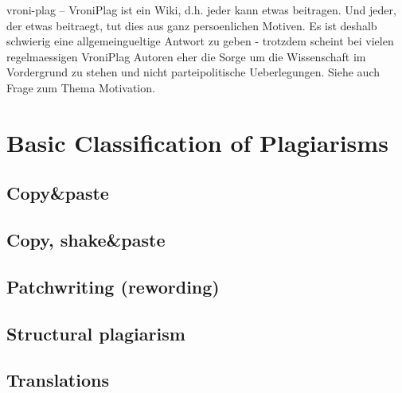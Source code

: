 vroni-plag -- VroniPlag ist ein Wiki, d.h. jeder kann etwas beitragen. Und jeder, der etwas beitraegt, tut dies aus ganz persoenlichen Motiven. Es ist deshalb schwierig eine allgemeingueltige Antwort zu geben - trotzdem scheint bei vielen regelmaessigen VroniPlag Autoren eher die Sorge um die Wissenschaft im Vordergrund zu stehen und nicht parteipolitische Ueberlegungen. Siehe auch Frage zum Thema Motivation. 


\newpage
\section{Basic Classification of Plagiarisms}

\subsection{Copy\&paste}
\subsection{Copy, shake\&paste}
\subsection{Patchwriting (rewording)}
\subsection{Structural plagiarism}
\subsection{Translations}



\newpage
